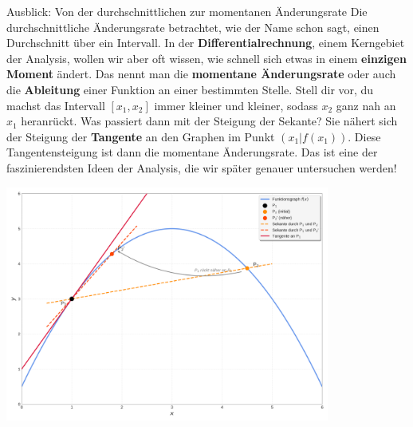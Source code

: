 \begin{infoboxumgebung}{Ausblick: Von der durchschnittlichen zur momentanen Änderungsrate}
Die durchschnittliche Änderungsrate betrachtet, wie der Name schon sagt, einen Durchschnitt über ein Intervall. In der \textbf{Differentialrechnung}, einem Kerngebiet der Analysis, wollen wir aber oft wissen, wie schnell sich etwas in einem \textbf{einzigen Moment} ändert. Das nennt man die \textbf{momentane Änderungsrate} oder auch die \textbf{Ableitung} einer Funktion an einer bestimmten Stelle.
Stell dir vor, du machst das Intervall $[x_1, x_2]$ immer kleiner und kleiner, sodass $x_2$ ganz nah an $x_1$ heranrückt. Was passiert dann mit der Steigung der Sekante? Sie nähert sich der Steigung der \textbf{Tangente} an den Graphen im Punkt $(x_1|f(x_1))$. Diese Tangentensteigung ist dann die momentane Änderungsrate. Das ist eine der faszinierendsten Ideen der Analysis, die wir später genauer untersuchen werden!
\begin{center}
    \includegraphics[width=0.8\textwidth]{grafiken/Sekante_zur_Tangente.png}
    \label{fig:sekante_tangente}
\end{center}

\end{infoboxumgebung}


